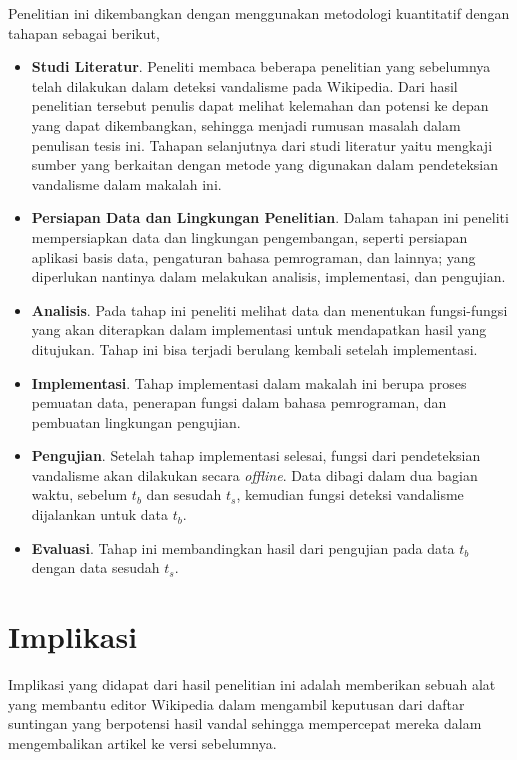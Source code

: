 \documentclass[12pt,a4paper,titlepage]{article}
\begin{document}
Penelitian ini dikembangkan dengan menggunakan metodologi kuantitatif dengan tahapan sebagai berikut,
\begin{itemize}
	\item \textbf{Studi Literatur}. Peneliti membaca beberapa penelitian
yang sebelumnya telah dilakukan dalam deteksi vandalisme pada Wikipedia. Dari
hasil penelitian tersebut penulis dapat melihat kelemahan dan potensi ke depan
yang dapat dikembangkan, sehingga menjadi rumusan masalah dalam penulisan tesis
ini. Tahapan selanjutnya dari studi literatur yaitu mengkaji sumber yang
berkaitan dengan metode yang digunakan dalam pendeteksian vandalisme dalam
makalah ini.
	\item \textbf{Persiapan Data dan Lingkungan Penelitian}. Dalam tahapan
ini peneliti mempersiapkan data dan lingkungan pengembangan, seperti persiapan
aplikasi basis data, pengaturan bahasa pemrograman, dan lainnya; yang
diperlukan nantinya dalam melakukan analisis, implementasi, dan pengujian.
	\item \textbf{Analisis}. Pada tahap ini peneliti melihat data dan
menentukan fungsi-fungsi yang akan diterapkan dalam implementasi untuk
mendapatkan hasil yang ditujukan. Tahap ini bisa terjadi berulang kembali
setelah implementasi.
	\item \textbf{Implementasi}. Tahap implementasi dalam makalah ini
berupa proses pemuatan data, penerapan fungsi dalam bahasa pemrograman, dan
pembuatan lingkungan pengujian.
	\item \textbf{Pengujian}. Setelah tahap implementasi selesai, fungsi
dari pendeteksian vandalisme akan dilakukan secara \textit{offline}. Data
dibagi dalam dua bagian waktu, sebelum $ t_{b} $ dan sesudah $ t_{s} $,
kemudian fungsi deteksi vandalisme dijalankan untuk data $t_{b}$.
	\item \textbf{Evaluasi}. Tahap ini membandingkan hasil dari pengujian
pada data $t_{b}$ dengan data sesudah $t_{s}$.
\end{itemize}

\section{Implikasi}\label{sec:implikasi}

Implikasi yang didapat dari hasil penelitian ini adalah memberikan sebuah alat
yang membantu editor Wikipedia dalam mengambil keputusan dari daftar suntingan
yang berpotensi hasil vandal sehingga mempercepat mereka dalam mengembalikan
artikel ke versi sebelumnya.
\end{document}
